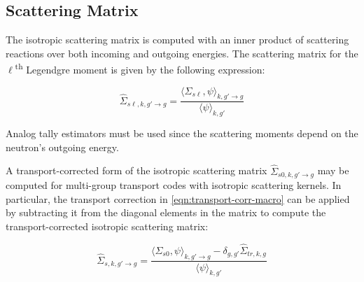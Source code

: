 \subsection{Scattering Matrix}
\label{subsubsec:tally-types-scatt-mat}

The isotropic scattering matrix is computed with an inner product of scattering reactions over both incoming and outgoing energies. The scattering matrix for the $\ell$\textsuperscript{th} Legendgre moment is given by the following expression:



\begin{equation}
\label{eqn:scatt-macro}
\hat{\Sigma}_{s\ell,k,g'\rightarrow g} = \frac{\langle \Sigma_{s\ell}, \psi \rangle_{k,g'\rightarrow g}}{\langle \psi \rangle_{k,g'}}
\end{equation}

\noindent Analog tally estimators must be used since the scattering moments depend on the neutron's outgoing energy.

A transport-corrected form of the isotropic scattering matrix $\hat{\Sigma}_{s0,k,g'\rightarrow g}$ may be computed for multi-group transport codes with isotropic scattering kernels. In particular, the transport correction in \autoref{eqn:transport-corr-macro} can be applied by subtracting it from the diagonal elements in the matrix to compute the transport-corrected isotropic scattering matrix:

\begin{equation}
\label{eqn:scatt-trans-macro}
\hat{\Sigma}_{s,k,g'\rightarrow g} = \frac{\langle \Sigma_{s0}, \psi \rangle_{k,g'\rightarrow g} - \delta_{g,g'} \hat{\Sigma}_{tr,k,g}}{\langle \psi \rangle_{k,g'}}
\end{equation}


